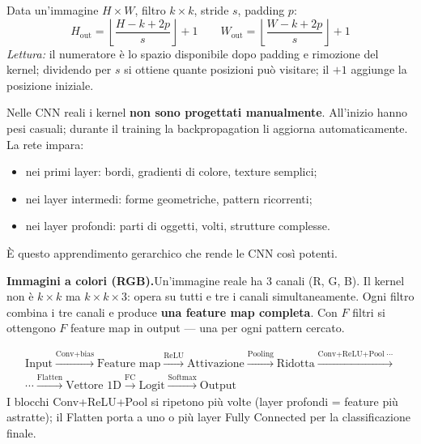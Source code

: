 \documentclass[
  11pt,
]{article}
\begin{document}
\begin{formulabox}[title={\textbf{Dimensione dell'output}}]
Data un'immagine $H \times W$, filtro $k\times k$, stride $s$, padding $p$:
\[
H_{\text{out}} = \left\lfloor\frac{H - k + 2p}{s}\right\rfloor + 1
\qquad
W_{\text{out}} = \left\lfloor\frac{W - k + 2p}{s}\right\rfloor + 1
\]
\textit{Lettura:} il numeratore è lo spazio disponibile dopo padding e rimozione del kernel; dividendo per $s$ si ottiene quante posizioni può visitare; il $+1$ aggiunge la posizione iniziale.
\end{formulabox}

\begin{notabox}[title={\textbf{I filtri vengono appresi, non scritti a mano}}]
Nelle CNN reali i kernel \textbf{non sono progettati manualmente}. All'inizio hanno pesi casuali; durante il training la backpropagation li aggiorna automaticamente. La rete impara:
\begin{itemize}
  \item nei primi layer: bordi, gradienti di colore, texture semplici;
  \item nei layer intermedi: forme geometriche, pattern ricorrenti;
  \item nei layer profondi: parti di oggetti, volti, strutture complesse.
\end{itemize}
È questo apprendimento gerarchico che rende le CNN così potenti.
\end{notabox}

\medskip
\textbf{Immagini a colori (RGB).}\quad Un'immagine reale ha 3 canali (R, G, B). Il kernel non è $k{\times}k$ ma $k{\times}k{\times}3$: opera su tutti e tre i canali simultaneamente. Ogni filtro combina i tre canali e produce \textbf{una feature map completa}. Con $F$ filtri si ottengono $F$ feature map in output — una per ogni pattern cercato.

\begin{formulabox}[title={\textbf{Pipeline completa di una CNN}}]
\begin{gather*}
\text{Input}
\xrightarrow{\text{Conv+bias}}
\text{Feature map}
\xrightarrow{\text{ReLU}}
\text{Attivazione}
\xrightarrow{\text{Pooling}}
\text{Ridotta}
\xrightarrow{\text{Conv+ReLU+Pool}\;\cdots} \\[6pt]
\cdots\xrightarrow{\text{Flatten}}
\text{Vettore 1D}
\xrightarrow{\text{FC}}
\text{Logit}
\xrightarrow{\text{Softmax}}
\text{Output}
\end{gather*}
I blocchi Conv+ReLU+Pool si ripetono più volte (layer profondi = feature più astratte); il Flatten porta a uno o più layer Fully Connected per la classificazione finale.
\end{formulabox}
\end{document}
